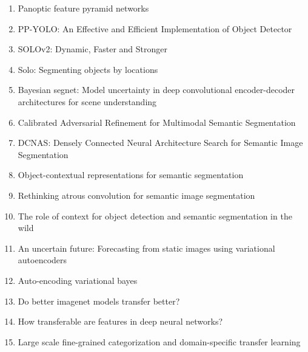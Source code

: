 \documentclass[acmlarge]{acmart}
\begin{document}
\begin{enumerate}
	\item Panoptic feature pyramid networks \cite{kirillov2019panoptic} 

	\item PP-YOLO: An Effective and Efficient Implementation of Object Detector \cite{long2020pp} 

	\item SOLOv2: Dynamic, Faster and Stronger \cite{wang2020solov2} 

	\item Solo: Segmenting objects by locations \cite{wang2019solo} 

	\item Bayesian segnet: Model uncertainty in deep convolutional encoder-decoder architectures for scene understanding \cite{kendall2015bayesian} 

	\item Calibrated Adversarial Refinement for Multimodal Semantic Segmentation \cite{kassapis2020calibrated} 

	\item DCNAS: Densely Connected Neural Architecture Search for Semantic Image Segmentation \cite{zhang2020dcnas} 

	\item Object-contextual representations for semantic segmentation \cite{yuan2019object} 

	\item Rethinking atrous convolution for semantic image segmentation \cite{chen2017rethinking} 

	\item The role of context for object detection and semantic segmentation in the wild \cite{mottaghi2014role} 

	\item An uncertain future: Forecasting from static images using variational autoencoders \cite{walker2016uncertain} 

	\item Auto-encoding variational bayes \cite{kingma2013auto} 

	\item Do better imagenet models transfer better? \cite{kornblith2019better} 

	\item How transferable are features in deep neural networks? \cite{yosinski2014transferable} 

	\item Large scale fine-grained categorization and domain-specific transfer learning \cite{cui2018large} 


\end{enumerate}
\end{document}
